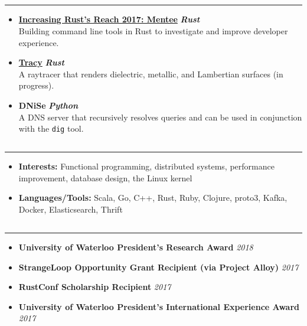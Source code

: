 \documentclass[5pt,letterpaper]{article}
\begin{document}
\subsection*{}
\hrule
\vspace{1.0em}
\begin{itemize}[leftmargin=1em, noitemsep]
  \item []
    \textbf{\href{https://blog.rust-lang.org/2017/06/27/Increasing-Rusts-Reach.html}{Increasing
    Rust's Reach 2017: Mentee}} \hfill \textbf{\emph{Rust}}
    \\
    Building command line tools in Rust to investigate and improve developer
    experience.
  \item[]
    \textbf{\href{https://github.com/arshiamufti/tracy}{Tracy}} \hfill \textbf{\emph{Rust}}
    \\
    A raytracer that renders dielectric, metallic, and Lambertian surfaces (in progress).
  \item[]
    \textbf{DNiSe} \hfill \textbf{\emph{Python}}
    \\
    A DNS server that recursively resolves queries and can be used in
    conjunction with the \texttt{dig} tool.
\end{itemize}


\subsection*{}
\hrule
\vspace{1.0em}
\begin{itemize}[leftmargin=1em, noitemsep]
  \item[]
    \textbf{Interests:} Functional programming, distributed systems,
    performance improvement, database design, the Linux kernel
  \item[]
    \textbf{Languages/Tools:} Scala, Go, C++, Rust, Ruby, Clojure, proto3, Kafka, Docker, Elasticsearch, Thrift
\end{itemize}

\subsection*{}
\hrule
\vspace{1.0em}
\begin{itemize}[leftmargin=1em, noitemsep]
  \item[] \textbf{University of Waterloo President's Research Award} \hfill \emph{2018}
  \item[] \textbf{StrangeLoop Opportunity Grant Recipient (via Project Alloy)} \hfill \emph{2017}
  \item[] \textbf{RustConf Scholarship Recipient} \hfill \emph{2017}
  \item[] \textbf{University of Waterloo President's International Experience Award} \hfill \emph{2017}
\end{itemize}
\end{document}
